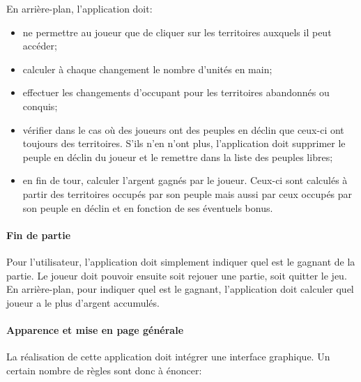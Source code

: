 \documentclass[a4paper, 11pt]{article}
\begin{document}
			En arrière-plan, l'application doit:
			\begin{itemize}
				\item ne permettre au joueur que de cliquer sur les territoires auxquels il peut accéder;
				\item calculer à chaque changement le nombre d'unités en main;
				\item effectuer les changements d'occupant pour les territoires abandonnés ou conquis;
				\item vérifier dans le cas où des joueurs ont des peuples en déclin que ceux-ci ont toujours des territoires. S'ils n'en n'ont plus, l'application doit supprimer le peuple en déclin du joueur et le remettre dans la liste des peuples libres;
				\item en fin de tour, calculer l'argent gagnés par le joueur. Ceux-ci sont calculés à partir des territoires occupés par son peuple mais aussi par ceux occupés par son peuple en déclin et en fonction de ses éventuels bonus.
			\end{itemize}
			
			\paragraph{Fin de partie\\}
			
			Pour l'utilisateur, l'application doit simplement indiquer quel est le gagnant de la partie. Le joueur doit pouvoir ensuite soit rejouer une partie, soit quitter le jeu. \\
			En arrière-plan, pour indiquer quel est le gagnant, l'application doit calculer quel joueur a le plus d'argent accumulés.
		
			\paragraph{Apparence et mise en page générale\\}
			
			La réalisation de cette application doit intégrer une interface graphique. Un certain nombre de règles sont donc à énoncer:\\
			
\end{document}
